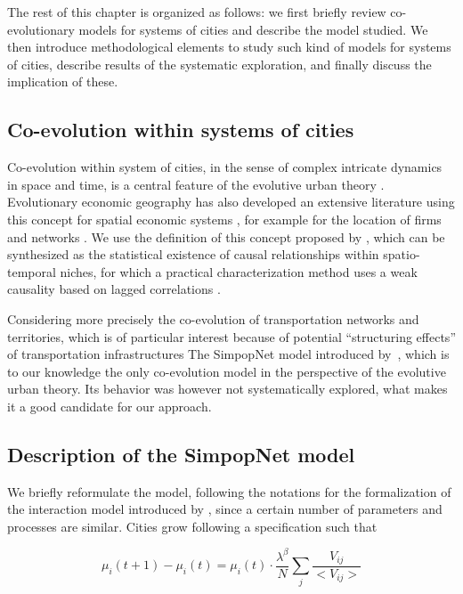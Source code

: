 The rest of this chapter is organized as follows: we first briefly review co-evolutionary models for systems of cities and describe the model studied. We then introduce methodological elements to study such kind of models for systems of cities, describe results of the systematic exploration, and finally discuss the implication of these.





\subsection{Co-evolution within systems of cities}


Co-evolution within system of cities, in the sense of complex intricate dynamics in space and time, is a central feature of the evolutive urban theory \cite{pumain2010theorie}. Evolutionary economic geography has also developed an extensive literature using this concept for spatial economic systems \cite{schamp201020}, for example for the location of firms and networks \cite{doi:10.1080/00343400802662658}. We use the definition of this concept proposed by \cite{raimbault:tel-01857741}, which can be synthesized as the statistical existence of causal relationships within spatio-temporal niches, for which a practical characterization method uses a weak causality based on lagged correlations \cite{raimbault2017identification}.

Considering more precisely the co-evolution of transportation networks and territories, which is of particular interest because of potential ``structuring effects'' of transportation infrastructures 
The SimpopNet model introduced by~\cite{schmitt2014modelisation}, which is to our knowledge the only co-evolution model in the perspective of the evolutive urban theory. Its behavior was however not systematically explored, what makes it a good candidate for our approach.



\subsection{Description of the SimpopNet model}


We briefly reformulate the model, following the notations for the formalization of the interaction model introduced by \cite{raimbault2018indirect}, since a certain number of parameters and processes are similar. Cities grow following a specification such that

\begin{equation}
\mu_i(t+1) - \mu_i (t) = \mu_i (t) \cdot \frac{\lambda^{\beta}}{N} \sum_{j} \frac{V_{ij}}{<V_{ij}>}
\end{equation}

